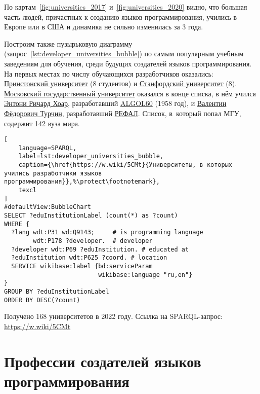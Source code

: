 По картам~\ref{fig:universities_2017} и~\ref{fig:universities_2020} видно, что большая часть людей, причастных к созданию языков программирования, учились в Европе или в США и динамика не сильно изменилась за 3 года.

Построим также пузырьковую диаграмму (запрос~\ref{lst:developer_universities_bubble}) по самым популярным учебным заведениям для обучения, среди будущих создателей языков программирования. На первых местах по числу обучающихся разработчиков оказались: \href{https://www.wikidata.org/wiki/Q21578}{Принстонский университет} (8 студентов) и \href{https://www.wikidata.org/wiki/Q41506}{Стэнфордский университет} (8). \href{https://ru.wikipedia.org/wiki/Московский_государственный_университет}{Московский государственный университет} оказался в конце списка, в нём учился \href{https://www.wikidata.org/wiki/Q92602}{Энтони Ричард Хоар}, разработавший \href{https://www.wikidata.org/wiki/Q188436}{ALGOL60} (1958 год), и \href{https://www.wikidata.org/wiki/Q4466506}{Валентин Фёдорович Турчин}, разработавший \href{https://www.wikidata.org/wiki/Q2626418}{РЕФАЛ}. 
Список, в~который попал МГУ, содержит 142 вуза мира.
%
%
\begin{marginfigure}[-12\baselineskip]
\begin{lstlisting}[
	language=SPARQL,
	label=lst:developer_universities_bubble,
    caption={\href{https://w.wiki/5CMt}{Университеты, в которых учились разработчики языков программирования}},%\protect\footnotemark},
	texcl
]
#defaultView:BubbleChart
SELECT ?eduInstitutionLabel (count(*) as ?count) 
WHERE {
  ?lang wdt:P31 wd:Q9143;     # is programming language
        wdt:P178 ?developer.  # developer
  ?developer wdt:P69 ?eduInstitution. # educated at
  ?eduInstitution wdt:P625 ?coord. # location
  SERVICE wikibase:label {bd:serviceParam 
                          wikibase:language "ru,en"}
}
GROUP BY ?eduInstitutionLabel
ORDER BY DESC(?count)
\end{lstlisting}
Получено \num{168} университетов в 2022 году. Ссылка на SPARQL-запрос: \href{https://w.wiki/5CMt}{https://w.wiki/5CMt}
\end{marginfigure}




\newpage
\section{Профессии создателей языков программирования}

